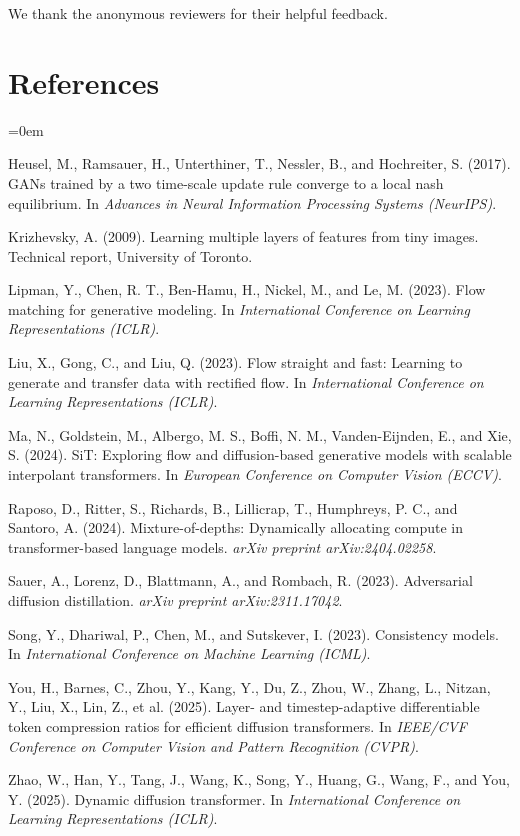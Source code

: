\documentclass{article}
\begin{document}
We thank the anonymous reviewers for their helpful feedback.

\section*{References}

\begin{list}{}{\leftmargin=0em}
\item Heusel, M., Ramsauer, H., Unterthiner, T., Nessler, B., and Hochreiter, S. (2017). GANs trained by a two time-scale update rule converge to a local nash equilibrium. In \textit{Advances in Neural Information Processing Systems (NeurIPS)}.

\item Krizhevsky, A. (2009). Learning multiple layers of features from tiny images. Technical report, University of Toronto.

\item Lipman, Y., Chen, R. T., Ben-Hamu, H., Nickel, M., and Le, M. (2023). Flow matching for generative modeling. In \textit{International Conference on Learning Representations (ICLR)}.

\item Liu, X., Gong, C., and Liu, Q. (2023). Flow straight and fast: Learning to generate and transfer data with rectified flow. In \textit{International Conference on Learning Representations (ICLR)}.

\item Ma, N., Goldstein, M., Albergo, M. S., Boffi, N. M., Vanden-Eijnden, E., and Xie, S. (2024). SiT: Exploring flow and diffusion-based generative models with scalable interpolant transformers. In \textit{European Conference on Computer Vision (ECCV)}.

\item Raposo, D., Ritter, S., Richards, B., Lillicrap, T., Humphreys, P. C., and Santoro, A. (2024). Mixture-of-depths: Dynamically allocating compute in transformer-based language models. \textit{arXiv preprint arXiv:2404.02258}.

\item Sauer, A., Lorenz, D., Blattmann, A., and Rombach, R. (2023). Adversarial diffusion distillation. \textit{arXiv preprint arXiv:2311.17042}.

\item Song, Y., Dhariwal, P., Chen, M., and Sutskever, I. (2023). Consistency models. In \textit{International Conference on Machine Learning (ICML)}.

\item You, H., Barnes, C., Zhou, Y., Kang, Y., Du, Z., Zhou, W., Zhang, L., Nitzan, Y., Liu, X., Lin, Z., et al. (2025). Layer- and timestep-adaptive differentiable token compression ratios for efficient diffusion transformers. In \textit{IEEE/CVF Conference on Computer Vision and Pattern Recognition (CVPR)}.

\item Zhao, W., Han, Y., Tang, J., Wang, K., Song, Y., Huang, G., Wang, F., and You, Y. (2025). Dynamic diffusion transformer. In \textit{International Conference on Learning Representations (ICLR)}.
\end{list}
\end{document}
